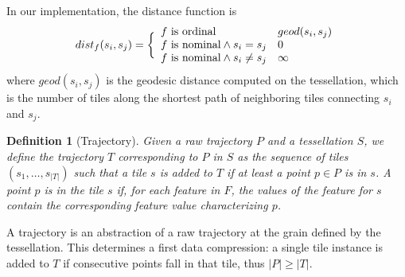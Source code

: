 \documentclass[
]{ceurart}
\newtheorem{definition}{Definition}
\begin{document}
In our implementation, the distance function is
\begin{equation}
dist_f(s_i,s_j) =
\bigg \{
\begin{array}{ll}
f \textup{ is ordinal}  & geod(s_i,s_j) \\
f \textup{ is nominal} \wedge s_i = s_j & 0 \\
f \textup{ is nominal} \wedge s_i \neq s_j & \infty \\
\end{array}
\end{equation}
%
where $geod(s_i,s_j)$ is the geodesic distance \citep{bouttier2003geodesic} computed on the tessellation, which is the number of tiles along the shortest path of neighboring tiles connecting $s_i$ and $s_j$.

\begin{definition}[Trajectory] 
\label{def:tes}
Given a raw trajectory $P$ and a tessellation $S$, we define the \textit{trajectory} $T$ corresponding to $P$ in $S$ as the sequence of tiles $(s_{1}, \ldots, s_{|T|})$ such that a tile $s$ is added to $T$ if at least a point $p \in P$ is in $s$.
A point $p$ \textit{is in} the tile $s$ if, for each feature in $F$, the values of the feature for $s$ contain the corresponding feature value characterizing $p$.
\end{definition}

A trajectory is an abstraction of a raw trajectory at the grain defined by the tessellation.
This determines a first data compression: a single tile instance is added to $T$ if consecutive points fall in that tile, thus $|P| \geq |T|$.
\end{document}
